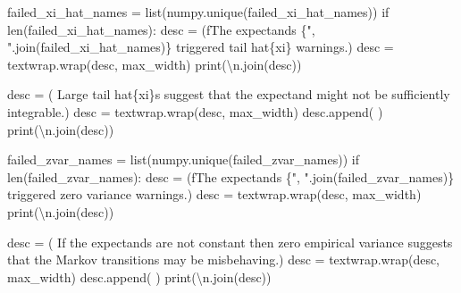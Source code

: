 \documentclass[
  letterpaper,
  DIV=11,
  numbers=noendperiod]{scrartcl}
\newenvironment{Shaded}{\begin{snugshade}}{\end{snugshade}}
\newcommand{\BuiltInTok}[1]{\textcolor[rgb]{0.00,0.23,0.31}{#1}}
\newcommand{\CharTok}[1]{\textcolor[rgb]{0.13,0.47,0.30}{#1}}
\newcommand{\ControlFlowTok}[1]{\textcolor[rgb]{0.00,0.23,0.31}{#1}}
\newcommand{\NormalTok}[1]{\textcolor[rgb]{0.00,0.23,0.31}{#1}}
\newcommand{\OperatorTok}[1]{\textcolor[rgb]{0.37,0.37,0.37}{#1}}
\newcommand{\SpecialCharTok}[1]{\textcolor[rgb]{0.37,0.37,0.37}{#1}}
\newcommand{\SpecialStringTok}[1]{\textcolor[rgb]{0.13,0.47,0.30}{#1}}
\newcommand{\StringTok}[1]{\textcolor[rgb]{0.13,0.47,0.30}{#1}}
\begin{document}
\begin{Shaded}
\begin{Highlighting}[]
\NormalTok{  failed\_xi\_hat\_names }\OperatorTok{=} \BuiltInTok{list}\NormalTok{(numpy.unique(failed\_xi\_hat\_names))}
  \ControlFlowTok{if} \BuiltInTok{len}\NormalTok{(failed\_xi\_hat\_names):}
\NormalTok{    desc }\OperatorTok{=}\NormalTok{ (}\SpecialStringTok{f\textquotesingle{}The expectands }\SpecialCharTok{\{}\StringTok{", "}\SpecialCharTok{.}\NormalTok{join(failed\_xi\_hat\_names)}\SpecialCharTok{\}}\SpecialStringTok{ \textquotesingle{}}
             \StringTok{\textquotesingle{}triggered tail hat}\SpecialCharTok{\{xi\}}\StringTok{ warnings.\textquotesingle{}}\NormalTok{)}
\NormalTok{    desc }\OperatorTok{=}\NormalTok{ textwrap.wrap(desc, max\_width)}
    \BuiltInTok{print}\NormalTok{(}\StringTok{\textquotesingle{}}\CharTok{\textbackslash{}n}\StringTok{\textquotesingle{}}\NormalTok{.join(desc))}

\NormalTok{    desc }\OperatorTok{=}\NormalTok{ (}\StringTok{\textquotesingle{}  Large tail hat}\SpecialCharTok{\{xi\}}\StringTok{s suggest that the expectand \textquotesingle{}}
            \StringTok{\textquotesingle{}might not be sufficiently integrable.\textquotesingle{}}\NormalTok{)}
\NormalTok{    desc }\OperatorTok{=}\NormalTok{ textwrap.wrap(desc, max\_width)}
\NormalTok{    desc.append(}\StringTok{\textquotesingle{} \textquotesingle{}}\NormalTok{)}
    \BuiltInTok{print}\NormalTok{(}\StringTok{\textquotesingle{}}\CharTok{\textbackslash{}n}\StringTok{\textquotesingle{}}\NormalTok{.join(desc))}

\NormalTok{  failed\_zvar\_names }\OperatorTok{=} \BuiltInTok{list}\NormalTok{(numpy.unique(failed\_zvar\_names))}
  \ControlFlowTok{if} \BuiltInTok{len}\NormalTok{(failed\_zvar\_names):}
\NormalTok{    desc }\OperatorTok{=}\NormalTok{ (}\SpecialStringTok{f\textquotesingle{}The expectands }\SpecialCharTok{\{}\StringTok{", "}\SpecialCharTok{.}\NormalTok{join(failed\_zvar\_names)}\SpecialCharTok{\}}\SpecialStringTok{ \textquotesingle{}}
             \StringTok{\textquotesingle{}triggered zero variance warnings.\textquotesingle{}}\NormalTok{)}
\NormalTok{    desc }\OperatorTok{=}\NormalTok{ textwrap.wrap(desc, max\_width)}
    \BuiltInTok{print}\NormalTok{(}\StringTok{\textquotesingle{}}\CharTok{\textbackslash{}n}\StringTok{\textquotesingle{}}\NormalTok{.join(desc))}

\NormalTok{    desc }\OperatorTok{=}\NormalTok{ (}\StringTok{\textquotesingle{}  If the expectands are not constant then zero empirical\textquotesingle{}}
            \StringTok{\textquotesingle{} variance suggests that the Markov\textquotesingle{}}
            \StringTok{\textquotesingle{} transitions may be misbehaving.\textquotesingle{}}\NormalTok{)}
\NormalTok{    desc }\OperatorTok{=}\NormalTok{ textwrap.wrap(desc, max\_width)}
\NormalTok{    desc.append(}\StringTok{\textquotesingle{} \textquotesingle{}}\NormalTok{)}
    \BuiltInTok{print}\NormalTok{(}\StringTok{\textquotesingle{}}\CharTok{\textbackslash{}n}\StringTok{\textquotesingle{}}\NormalTok{.join(desc))}


\end{Highlighting}
\end{Shaded}
\end{document}
